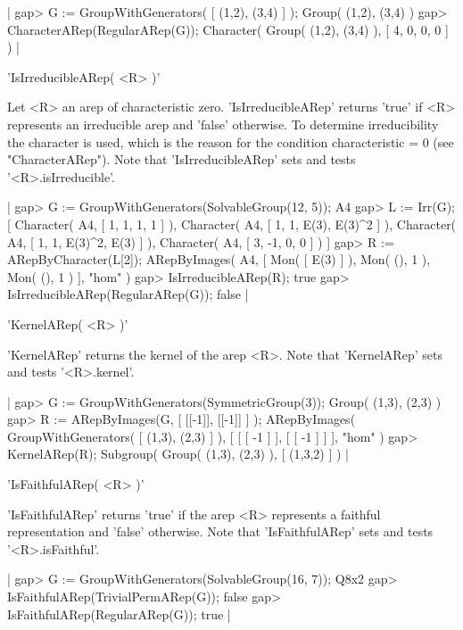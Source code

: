 |    gap> G := GroupWithGenerators( [ (1,2), (3,4) ] );
    Group( (1,2), (3,4) )
    gap> CharacterARep(RegularARep(G));
    Character( Group( (1,2), (3,4) ), [ 4, 0, 0, 0 ] ) |


'IsIrreducibleARep( <R> )'

Let <R> an arep of characteristic zero. 'IsIrreducibleARep' returns
'true' if <R> represents an irreducible arep and 'false'
otherwise. To determine irreducibility the character is used, 
which is the reason for the condition characteristic = 0 
(see "CharacterARep").
Note that 'IsIrreducibleARep' sets and tests '<R>.isIrreducible'.

|    gap> G := GroupWithGenerators(SolvableGroup(12, 5));
    A4
    gap> L := Irr(G);
    [ Character( A4, [ 1, 1, 1, 1 ] ), 
      Character( A4, [ 1, 1, E(3), E(3)^2 ] ), 
      Character( A4, [ 1, 1, E(3)^2, E(3) ] ), 
      Character( A4, [ 3, -1, 0, 0 ] ) ]
    gap> R := ARepByCharacter(L[2]);
    ARepByImages(
      A4,
      [ Mon( [ E(3) ] ),
        Mon( (), 1 ),
        Mon( (), 1 )
      ],
      "hom"
    )
    gap> IsIrreducibleARep(R);
    true 
    gap> IsIrreducibleARep(RegularARep(G));
    false |


'KernelARep( <R> )'

'KernelARep' returns the kernel of the arep <R>.
Note that 'KernelARep' sets and tests '<R>.kernel'.

|    gap> G := GroupWithGenerators(SymmetricGroup(3));
    Group( (1,3), (2,3) )
    gap> R := ARepByImages(G, [ [[-1]], [[-1]] ] );
    ARepByImages(
      GroupWithGenerators( [ (1,3), (2,3) ] ),
      [ [ [ -1 ] ],
        [ [ -1 ] ]
      ],
      "hom"
    )
    gap> KernelARep(R);
    Subgroup( Group( (1,3), (2,3) ), [ (1,3,2) ] ) |


'IsFaithfulARep( <R> )'

'IsFaithfulARep' returns 'true' if the arep <R> represents a faithful 
representation and 'false' otherwise.
Note that 'IsFaithfulARep' sets and tests '<R>.isFaithful'.

|    gap> G := GroupWithGenerators(SolvableGroup(16, 7));
    Q8x2
    gap> IsFaithfulARep(TrivialPermARep(G));
    false
    gap> IsFaithfulARep(RegularARep(G));
    true |

